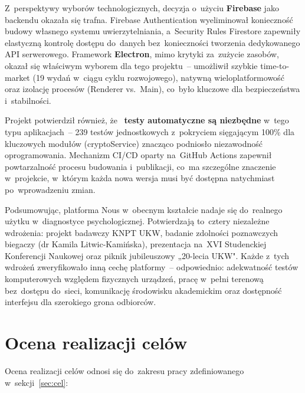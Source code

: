\documentclass[12pt, a4paper, oneside]{report}
\begin{document}
Z~perspektywy wyborów technologicznych, decyzja o~użyciu \textbf{Firebase} jako backendu okazała się trafna. Firebase Authentication wyeliminował konieczność budowy własnego systemu uwierzytelniania, a~Security Rules Firestore zapewniły elastyczną kontrolę dostępu do~danych bez~konieczności tworzenia dedykowanego API serwerowego. Framework \textbf{Electron}, mimo krytyki za~zużycie zasobów, okazał się właściwym wyborem dla tego projektu~-- umożliwił szybkie time-to-market (19 wydań w~ciągu cyklu rozwojowego), natywną wieloplatformowość oraz izolację procesów (Renderer vs.~Main), co~było kluczowe dla bezpieczeństwa i~stabilności.

Projekt potwierdził również, że ~\textbf{testy automatyczne są niezbędne} w~tego typu aplikacjach~-- 239 testów jednostkowych z~pokryciem sięgającym 100\% dla kluczowych modułów (cryptoService) znacząco podniosło niezawodność oprogramowania. Mechanizm CI/CD oparty na~GitHub Actions zapewnił powtarzalność procesu budowania i~publikacji, co~ma szczególne znaczenie w~projekcie, w~którym każda nowa wersja musi być dostępna natychmiast po~wprowadzeniu zmian.

Podsumowując, platforma Nous w~obecnym kształcie nadaje się do~realnego użytku w~diagnostyce psychologicznej. Potwierdzają to~cztery niezależne wdrożenia: projekt badawczy KNPT UKW, badanie zdolności poznawczych biegaczy (dr Kamila Litwic-Kamińska), prezentacja na~XVI Studenckiej Konferencji Naukowej oraz piknik jubileuszowy „20-lecia UKW". Ka\.{z}de z~tych wdrożeń zweryfikowało inną cechę platformy~-- odpowiednio: adekwatność testów komputerowych względem fizycznych urządzeń, pracę w~pełni terenową bez~dostępu do~sieci, komunikację środowisku akademickim oraz dostępność interfejsu dla szerokiego grona odbiorców.


\section{Ocena realizacji celów}
\label{sec:ocena}

Ocena realizacji celów odnosi się do~zakresu pracy zdefiniowanego w~sekcji~\ref{sec:cel}:
\end{document}
